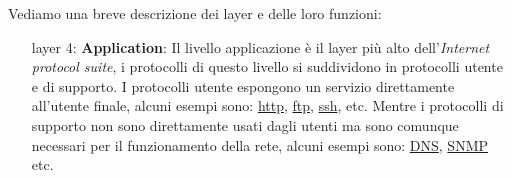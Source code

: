 Vediamo una breve descrizione dei layer e delle loro funzioni:

\begin{enumerate} %
    \item[layer 4:] \textbf{Application}: Il livello applicazione è il layer pi\`u alto dell'\textit{Internet protocol suite}, i protocolli di questo livello si suddividono in protocolli utente e di supporto. \newline
        I protocolli utente espongono un servizio direttamente all'utente finale, alcuni esempi sono: \href{https://en.wikipedia.org/wiki/Hypertext_Transfer_Protocol}{http}, \href{https://en.wikipedia.org/wiki/File_Transfer_Protocol}{ftp}, \href{https://en.wikipedia.org/wiki/Secure_Shell}{ssh}, etc. Mentre i protocolli di supporto non sono direttamente usati dagli utenti ma sono comunque necessari per il funzionamento della rete, alcuni esempi sono: \href{https://en.wikipedia.org/wiki/Domain_Name_System}{DNS}, \href{https://en.wikipedia.org/wiki/Simple_Network_Management_Protocol}{SNMP} etc.

\end{enumerate}
